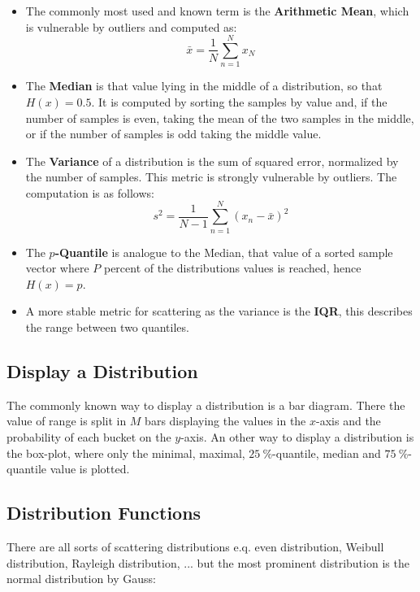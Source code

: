 \begin{itemize}
\item The commonly most used and known term is the \textbf{Arithmetic Mean}, which is vulnerable by outliers and computed as:
\begin{equation}
\bar x = \frac{1}{N}\sum_{n=1}^N x_N
\end{equation}
\item The \textbf{Median} is that value lying in the middle of a distribution, so that $H\left( x\right) = 0.5$. It is computed by sorting the samples by value and, if the number of samples is even, taking the mean of the two samples in the middle, or if the number of samples is odd taking the middle value.
\item The \textbf{Variance} of a distribution is the sum of squared error, normalized by the number of samples. This metric is strongly vulnerable by outliers. The computation is as follows:
\begin{equation}
s^2 = \frac{1}{N-1}\sum_{n=1}^N\left( x_n-\bar{x}\right)^2
\end{equation}
\item The \textbf{$p$-Quantile} is analogue to the Median, that value of a sorted sample vector where $P$ percent of the distributions values is reached, hence $H\left( x\right) = p$.
\item A more stable metric for scattering as the variance is the \textbf{\ac{IQR}}, this describes the range between two quantiles.
\end{itemize}

\subsection{Display a Distribution}

The commonly known way to display a distribution is a bar diagram. There the value of range is split in $M$ bars displaying the values in the $x$-axis and the probability of each bucket on the $y$-axis. An other way to display a distribution is the box-plot, where only the minimal, maximal, $\SI{25}{\percent}$-quantile, median and $\SI{75}{\percent}$-quantile value is plotted.

\subsection{Distribution Functions}
There are all sorts of scattering distributions e.q. even distribution, Weibull distribution, Rayleigh distribution, ... but the most prominent distribution is the normal distribution by Gauss:

